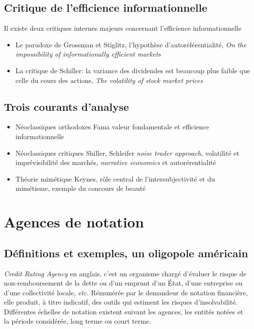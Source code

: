 \documentclass[main.tex]{subfiles}
\begin{document}
\subsection{Critique de l'efficience informationnelle}

Il existe deux critiques internes majeurs concernant l'efficience informationnelle
\begin{itemize}
        \item Le paradoxe de Grossman et Stiglitz, l'hypothèse d'autoréférentialité, \textit{On the impossibility of informationally efficient markets}
        \item La critique de Schiller: la variance des dividendes est beaucoup plus faible que celle du cours des actions, \textit{The volatility of stock market prices}
\end{itemize}

\subsection{Trois courants d'analyse}

\begin{itemize}
        \item Néoclassiques orthodoxes Fama valeur fondamentale et efficience informationnelle
        \item Néoclassiques critiques Shiller, Schleifer \textit{noise trader approach}, volatilité et imprévisibilité des marchés, \textit{narrative economics} et autorérentialité
        \item Théorie mimétique Keynes, rôle central de l'intersubjectivité et du mimétisme, exemple du concours de beauté
\end{itemize}

\section{Agences de notation}

\subsection{Définitions et exemples, un oligopole américain}

\begin{definition}
        \emph{Credit Rating Agency} en anglais, c'est un organisme chargé d'évaluer le risque de non-remboursement de la dette ou d'un emprunt d'un État, d'une entreprise ou d'une collectivité locale, \textit{etc.} Rémunérée par le demandeur de notation financière, elle produit, à titre indicatif, des outils qui estiment les risques d'insolvabilité. Différentes échelles de notation existent suivant les agences, les entités notées et la période considérée, long terme ou court terme. 
\end{definition}
\end{document}
